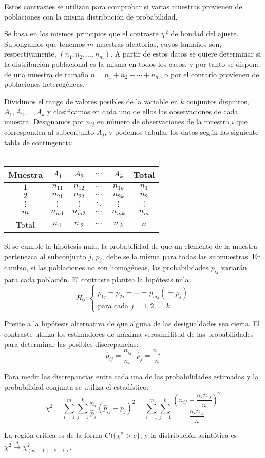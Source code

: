 Estos contrastes se utilizan para comprobar si varias muestras provienen de poblaciones con la misma distribuci\'on de probabilidad.


Se basa en los mismos principios que el contraste $\chi^2$ de bondad del ajuste. Supongamos que tenemos $m$ muestras aleatorias, cuyos tama\~nos son, respectivamente, $(n_1,n_2,\ldots,n_m)$. A partir de estos datos se quiere determinar si la distribuci\'on poblacional es la misma en todos los casos, y por tanto se dispone de una muestra de tama\~no $n=n_1+n_2+\cdots+n_m$, o por el conrario provienen de poblaciones heterog\'eneas.

Dividimos el rango de valores posibles de la variable en $k$ conjuntos disjuntos, $A_1, A_2,\ldots,A_k$ y clasificamos en cada uno de ellos las observaciones de cada muestra. Designamos por $n_{ij}$ en n\'umero de observaciones de la muestra $i$ que corresponden al subconjunto $A_j$, y podemos tabular los datos seg\'un las siguiente tabla de contingencia:
\\
\\
\begin{tabular}{|c||cccc|c|}
\hline 
 Muestra & $A_1$ & $A_2$ & $\cdots$ & $A_k$ & Total \tabularnewline
\hline 
$1$ & $n_{11}$ & $n_{12}$ & $\cdots$ & $n_{1k}$ & $n_{1}$ \tabularnewline
$2$ & $n_{21}$ & $n_{22}$ & $\cdots$ & $n_{2k}$ & $n_{2}$ \tabularnewline
$\vdots$ & $\vdots$ & $\vdots$ & $\ddots$ & $\vdots$ & $\vdots$ \tabularnewline
$m$ & $n_{m1}$ & $n_{m2}$ & $\cdots$ & $n_{mk}$ & $n_{m}$ \tabularnewline
\hline 
Total  & $n_{.1}$ & $n_{.2}$ & $\cdots$ & $n_{.k}$ & $n$ \tabularnewline
\hline 
\end{tabular}

Si se cumple la hip\'otesis nula, la probabilidad de que un elemento de la muestra pertenezca al subconjunto $j$, $p_j$, debe se la misma para todas las submuestras. En cambio, si las poblaciones no son homog\'eneas, las probabilidades $p_{ij}$ variar\'an para cada poblaci\'on. El contraste plantea la hip\'otesis nula:
\[H_0:\left\{\begin{matrix}
p_{1j}=p_{2j}=\cdots=p_{mj}(=p_j) \\
\text{para cada  } j=1,2,\ldots,k
\end{matrix}\right.\]

Prente a la hip\'otesis alternativa de que alguna de las desigualdades sea cierta. El contraste utiliza los estimadores de m\'axima verosimilitud de las probabilidades para determinar las posibles discrepancias: 
\[\hat{p}_{ij}=\dfrac{n_{ij}}{n_{i.}} \;\;\hat{p}_j=\dfrac{n_{.j}}{n}\]

Para medir las discrepancias entre cada una de las probabilidades estimadas y la probabilidad conjunta se utiliza el estad\'istico:
\[\chi^2=\sum_{i=1}^m\sum_{j=1}^k\dfrac{n_i}{\hat{p}_{j}}(\hat{p}_{ij}-p_j)^2=\sum_{i=1}^m\sum_{j=1}^k\dfrac{(n_{ij}-\dfrac{n_in_{.j}}{n})^2}{\dfrac{n_in_{.j}}{n}}\]

La regi\'on cr\'itica es de la forma $C)\{\chi^2>c\}$, y la distribuci\'on asint\'otica es $\chi^2\overset{d}{\to}\chi^2_{(m-1)(k-1)}$.


